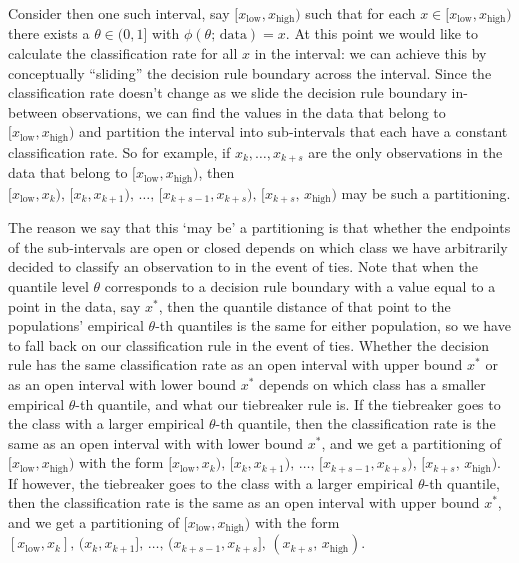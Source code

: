 \documentclass{article}
\begin{document}
Consider then one such interval, say
$[x_{\scriptscriptstyle\text{low}}, x_{\scriptscriptstyle\text{high}})$ such
that for each
$x \in [x_{\scriptscriptstyle\text{low}}, x_{\scriptscriptstyle\text{high}})$
there exists a $\theta \in (0, 1]$ with $\phi(\theta;\, \text{data}) = x$.  At
this point we would like to calculate the classification rate for all $x$ in the
interval: we can achieve this by conceptually ``sliding'' the decision rule
boundary across the interval.  Since the classification rate doesn't change as
we slide the decision rule boundary in-between observations, we can find the
values in the data that belong to
$[x_{\scriptscriptstyle\text{low}}, x_{\scriptscriptstyle\text{high}})$ and
partition the interval into sub-intervals that each have a constant
classification rate.  So for example, if $x_k, \dots, x_{k+s}$ are the only
observations in the data that belong to
$[x_{\scriptscriptstyle\text{low}}, x_{\scriptscriptstyle\text{high}})$, then
$[x_{\scriptscriptstyle\text{low}}, x_k),\, [x_k, x_{k+1}),\, \dots,\,
[x_{k+s-1}, x_{k+s}),\, [x_{k+s},\, x_{\scriptscriptstyle\text{high}})$ may be
such a partitioning.

The reason we say that this `may be' a partitioning is that whether the
endpoints of the sub-intervals are open or closed depends on which class we have
arbitrarily decided to classify an observation to in the event of ties.  Note
that when the quantile level $\theta$ corresponds to a decision rule boundary
with a value equal to a point in the data, say $x^{*}$, then the quantile
distance of that point to the populations' empirical $\theta$-th quantiles is
the same for either population, so we have to fall back on our classification
rule in the event of ties.  Whether the decision rule has the same
classification rate as an open interval with upper bound $x^{*}$ or as an open
interval with lower bound $x^{*}$ depends on which class has a smaller empirical
$\theta$-th quantile, and what our tiebreaker rule is.  If the tiebreaker goes
to the class with a larger empirical $\theta$-th quantile, then the
classification rate is the same as an open interval with with lower bound
$x^{*}$, and we get a partitioning of
$[x_{\scriptscriptstyle\text{low}}, x_{\scriptscriptstyle\text{high}})$ with the
form
$[x_{\scriptscriptstyle\text{low}}, x_k),\, [x_k, x_{k+1}),\, \dots,\,
[x_{k+s-1}, x_{k+s}),\, [x_{k+s},\, x_{\scriptscriptstyle\text{high}})$.  If
however, the tiebreaker goes to the class with a larger empirical $\theta$-th
quantile, then the classification rate is the same as an open interval with
upper bound $x^{*}$, and we get a partitioning of
$[x_{\scriptscriptstyle\text{low}}, x_{\scriptscriptstyle\text{high}})$ with the
form
$[x_{\scriptscriptstyle\text{low}}, x_k],\, (x_k, x_{k+1}],\, \dots,\,
(x_{k+s-1}, x_{k+s}],\, (x_{k+s},\, x_{\scriptscriptstyle\text{high}})$.
\end{document}
